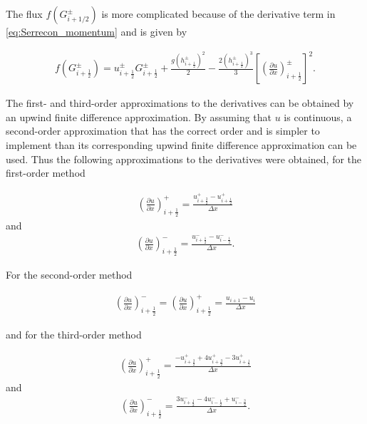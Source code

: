 \documentclass[SingleSpace,12pt,Proceedings]{Serre_ASCE}
\begin{document}
The flux $f(G^\pm_{i + 1/2})$ is more complicated because of the derivative term in \eqref{eq:Serrecon_momentum}  and is given by
\begin{linenomath*}
\begin{gather*} %
f\left(G^\pm_{i + \frac{1}{2}}\right)= u^\pm_{i + \frac{1}{2}} G^\pm_{i + \frac{1}{2}} + \frac{g \left(h^\pm_{i + \frac{1}{2}} \right)^2}{2} - \frac{2 \left(h^\pm_{i + \frac{1}{2}} \right)^3}{3} \left[\left(\frac{\partial u}{\partial x}\right)^\pm_{i + \frac{1}{2}}\right]^2.
\end{gather*}
\end{linenomath*}
The first- and third-order approximations to the derivatives can be obtained by an upwind finite difference approximation. By assuming that $u$ is continuous, a second-order approximation that has the correct order and is simpler to implement than its corresponding upwind finite difference approximation can be used. Thus the following approximations to the derivatives were obtained, for the first-order method
\begin{linenomath*}
\begin{gather*} %
\left(\frac{\partial u}{\partial x}\right)^+_{i + \frac{1}{2}} = \frac{ u^+_{i + \frac{3}{2}} - u^+_{i + \frac{1}{2}}}{\Delta x}
\end{gather*}
and
\begin{gather*}\label{eq:derivdisco1m}
\left(\frac{\partial u}{\partial x}\right)^-_{i + \frac{1}{2}} = \frac{ u^-_{i + \frac{1}{2}} - u^-_{i - \frac{1}{2}}}{\Delta x}.
\end{gather*}
\end{linenomath*}
For the second-order method
\begin{linenomath*}
\begin{gather*} %
\left(\frac{\partial u}{\partial x}\right)^-_{i + \frac{1}{2}} = \left(\frac{\partial u}{\partial x}\right)^+_{i + \frac{1}{2}} = \frac{u_{i + 1} - u_{i}}{\Delta x}
\end{gather*}
\end{linenomath*}
and for the third-order method
\begin{linenomath*}
\begin{gather*} %
\left(\frac{\partial u}{\partial x}\right)^+_{i + \frac{1}{2}} = \frac{ -u^+_{i + \frac{3}{2}} + 4u^+_{i + \frac{3}{2}}  -3 u^+_{i + \frac{1}{2}}}{\Delta x}
\end{gather*}
and
\begin{gather*} %
\left(\frac{\partial u}{\partial x}\right)^-_{i + \frac{1}{2}} = \frac{ 3u^-_{i + \frac{1}{2}} - 4u^-_{i - \frac{1}{2}} + u^-_{i - \frac{3}{2}}}{\Delta x}.
\end{gather*}
\end{linenomath*}
\end{document}
